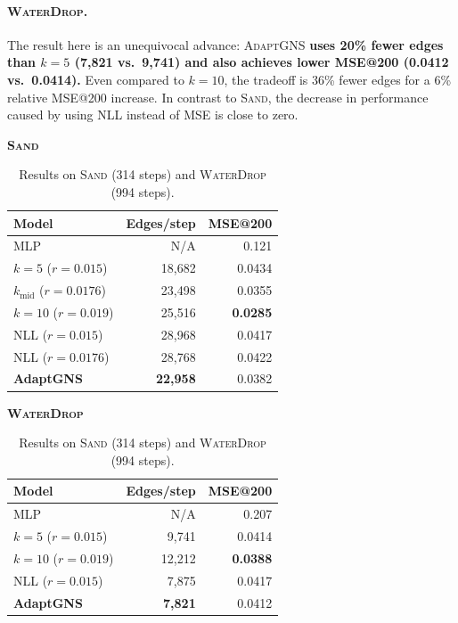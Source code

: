 \documentclass{article}
\begin{document}
\paragraph{\textsc{WaterDrop}.}
The result here is an unequivocal advance: \textsc{AdaptGNS} \textbf{uses 20\%
fewer edges than $k = 5$ (7,821 vs.\ 9,741) and also achieves lower MSE@200
(0.0412 vs.\ 0.0414).}
Even compared to $k = 10$, the tradeoff is 36\% fewer edges for a 6\% relative MSE@200
increase. In contrast to \textsc{Sand}, the decrease in performance caused by using NLL instead of MSE is close to zero.

\begin{table}[H]
  \caption{Results on \textsc{Sand} (314 steps) and \textsc{WaterDrop} (994 steps).}
  \label{tab:rollouts_sand_wd_mse200}
  \centering
  \footnotesize
  \setlength{\tabcolsep}{5pt}
  \begin{minipage}[t]{0.48\linewidth}
    \centering
    \textbf{\textsc{Sand}}\\[4pt]
    \begin{tabular}{@{}lrr@{}}
      \toprule
      Model & Edges/step & MSE@200 \\
      \midrule
      MLP & N/A & 0.121 \\
      $k =5$ ($r = 0.015$) & 18{,}682 & 0.0434 \\
      $k_{\mathrm{mid}}$ ($r = 0.0176$) & 23{,}498 & 0.0355 \\
      $k=10$ ($r = 0.019$) & 25{,}516 & \textbf{0.0285} \\
      NLL ($r = 0.015$) & 28{,}968 & 0.0417 \\
      NLL ($r = 0.0176$) & 28{,}768 & 0.0422 \\
      \textbf{AdaptGNS} & \textbf{22{,}958} & 0.0382 \\
      \bottomrule
    \end{tabular}
  \end{minipage}\hfill
  \begin{minipage}[t]{0.48\linewidth}
    \centering
    \textbf{\textsc{WaterDrop}}\\[4pt]
    \begin{tabular}{@{}lrr@{}}
      \toprule
      Model & Edges/step & MSE@200 \\
      \midrule
      MLP & N/A & 0.207 \\
      $k=5$ ($r = 0.015$) & 9{,}741 & 0.0414 \\
      $k=10$ ($r = 0.019$) & 12{,}212 & \textbf{0.0388} \\
      NLL ($r = 0.015$) & 7{,}875 & 0.0417 \\
      \textbf{AdaptGNS} & \textbf{7{,}821} & 0.0412 \\
      \bottomrule
    \end{tabular}
  \end{minipage}
\end{table}
\end{document}

